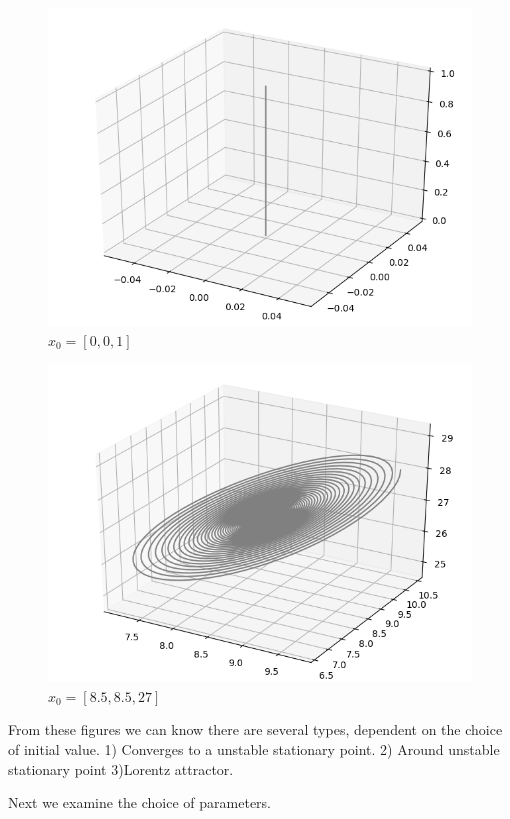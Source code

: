 \documentclass{article}
\begin{document}
\begin{figure}[H]
	\centering
	\caption{$x_0 = [0,0,1]$}
	\includegraphics[scale=0.5]{../3.png}
\end{figure}

\begin{figure}[H]
	\centering
	\caption{$x_0 = [8.5,8.5,27]$}
	\includegraphics[scale=0.5]{../4.png}
\end{figure}
From these figures we can know there are several types, dependent on the choice of initial value. 1) Converges to a unstable stationary point. 2) Around unstable stationary point 3)Lorentz attractor.


Next we examine the choice of parameters. 
\end{document}
